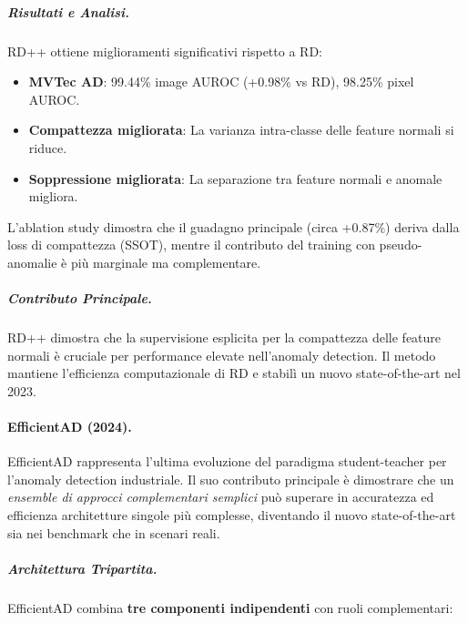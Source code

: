 \subparagraph{Risultati e Analisi.}

RD++ ottiene miglioramenti significativi rispetto a RD:
\begin{itemize}
\item \textbf{MVTec AD}: 99.44\% image AUROC (+0.98\% vs RD), 98.25\% pixel AUROC.
\item \textbf{Compattezza migliorata}: La varianza intra-classe delle feature normali si riduce. 
\item \textbf{Soppressione migliorata}: La separazione tra feature normali e anomale migliora.
\end{itemize}

L'ablation study dimostra che il guadagno principale (circa +0.87\%) deriva dalla loss di compattezza (SSOT), mentre il contributo del training con pseudo-anomalie è più marginale ma complementare.

\subparagraph{Contributo Principale.}

RD++ dimostra che la supervisione esplicita per la compattezza delle feature normali è cruciale per performance elevate nell'anomaly detection. Il metodo mantiene l'efficienza computazionale di RD e stabilì un nuovo state-of-the-art nel 2023.


\paragraph{EfficientAD (2024).}

EfficientAD \cite{batzner2024efficientad} rappresenta l'ultima evoluzione del paradigma student-teacher per l'anomaly detection industriale. Il suo contributo principale è dimostrare che un \textit{ensemble di approcci complementari semplici}  può superare in accuratezza ed efficienza architetture singole più complesse, diventando il nuovo state-of-the-art sia nei benchmark che in scenari reali.

\subparagraph{Architettura Tripartita.}

EfficientAD combina \textbf{tre componenti in\-di\-pen\-den\-ti} con ruoli complementari:

